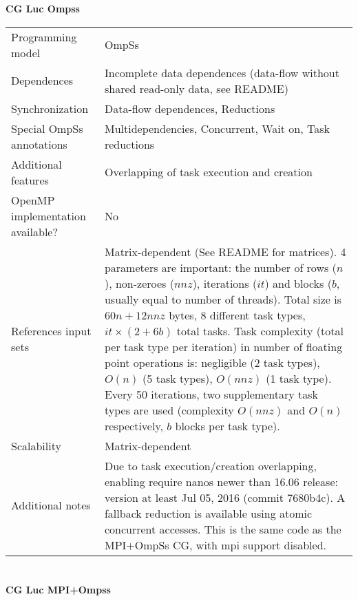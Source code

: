 \section*{}
\label{cg_luc_ompss}
\centering
\Huge
\textbf{CG Luc Ompss}

\begin{table}[h!]
  \large
  \centering
  \begin{tabular}{|l|p{8cm}|}
    \hline
    Programming model                & OmpSs \\
    Dependences                      & Incomplete data dependences (data-flow without shared read-only data, see README) \\
    Synchronization                  & Data-flow dependences, Reductions \\
    Special OmpSs annotations        & Multidependencies, Concurrent, Wait on, Task reductions \\
    Additional features              & Overlapping of task execution and creation \\
    OpenMP implementation available? & No \\
    References input sets            & Matrix-dependent (See README for matrices). 4 parameters are important: the number of rows ($n$), non-zeroes ($nnz$), iterations ($it$) and blocks ($b$, usually equal to number of threads).
    Total size is $60 n + 12 nnz$ bytes, 8 different task types, $it \times (2 + 6 b)$ total tasks. Task complexity (total per task type per iteration) in number of floating point operations is: negligible (2 task types), $O(n)$ (5 task types), $O(nnz)$ (1 task type). Every 50 iterations, two supplementary task types are used (complexity $O(nnz)$ and $O(n)$ respectively, $b$ blocks per task type). \\
    Scalability                      & Matrix-dependent \\
    Additional notes                 & Due to task execution/creation overlapping, enabling require nanos newer than 16.06 release: version at least Jul 05, 2016 (commit 7680b4c). A fallback reduction is available using atomic concurrent accesses. This is the same code as the MPI+OmpSs CG, with mpi support disabled. \\
    \hline
  \end{tabular}
\end{table}

\newpage

\section*{}
\label{cg_luc_mpi_ompss}
\centering
\Huge
\textbf{CG Luc MPI+Ompss}

